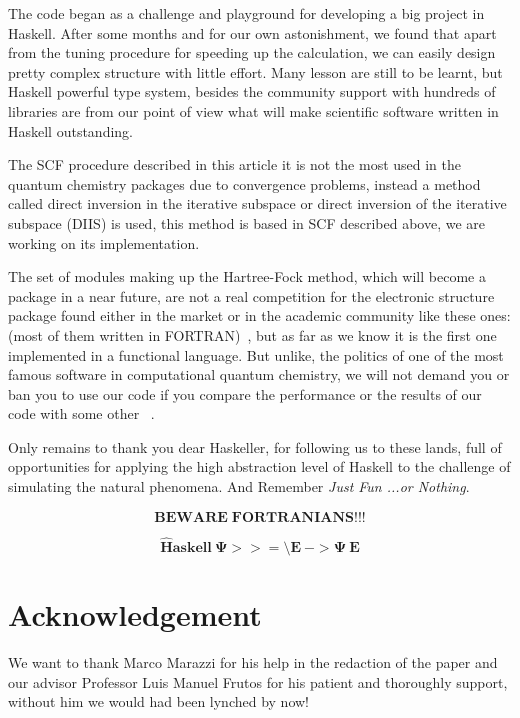 \documentclass{tmr}
\begin{document}
The code began as a challenge and playground for developing a big project 
in Haskell. After some months and for our own astonishment, we found that
apart from the tuning procedure for speeding up the calculation, we can
easily design pretty complex structure with little effort. Many lesson 
are still to be learnt, but Haskell powerful type system, besides the 
community support with hundreds of libraries are from our point of view what will make 
scientific software written in Haskell outstanding.

The SCF procedure described in this article it is not the most used in
the quantum chemistry packages due to convergence problems, instead a
 method called direct inversion in the iterative subspace or direct
inversion of the iterative subspace (DIIS) is used, this method is 
based in SCF described above, we are working on its implementation.

The set of modules making up the Hartree-Fock method, which will 
become a package in a near future, are not a real competition
for the electronic structure package found either in the market
or in the academic community like these ones: (most of them
written in FORTRAN)~\cite{software},
but as far as we know it is the first one implemented in a 
functional language. But unlike, the politics of one of the 
most famous software in computational quantum chemistry, we
will not demand you or ban you to use our code if you
compare the performance or the results of our code with some
other ~\cite{banned}. 

Only remains to thank you dear Haskeller, for following us to these 
lands, full of opportunities for applying the high abstraction level
of Haskell to the challenge of simulating the natural phenomena. And
Remember \textit{Just Fun ...or Nothing}. 

\[\mathbf{BEWARE\;FORTRANIANS!!!} \]


\[\mathbf{\hat{H}askell\: \Psi >>= \setminus E\: -> \Psi\: E }\]

\section{Acknowledgement}

We want to thank Marco Marazzi for his help
in the redaction of the paper and our advisor
Professor Luis Manuel Frutos for his patient
and thoroughly support, without
him we would had been lynched by now!
\end{document}
